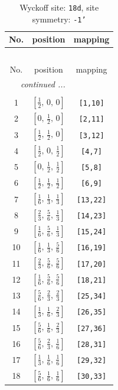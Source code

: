 \documentclass[fleqn,8pt]{jsarticle}
\begin{document}
\begin{longtable}{ccc}
\caption{Wyckoff site: {\tt 18d}, site symmetry: {\tt -1'}}
 \\
 \hline \hline
No. & position & mapping \\ \hline \endfirsthead

\multicolumn{2}{l}{\tablename\ \thetable{}} \\
 \hline \hline
No. & position & mapping \\ \hline \endhead

 \hline \hline
\multicolumn{2}{r}{\footnotesize\it continued ...} \\ \endfoot

 \hline \hline
\multicolumn{2}{r}{} \\ \endlastfoot

1 & $\left[ \frac{1}{2},\, 0,\, 0 \right]$ & {\tt [1,10]} \\ \hline
2 & $\left[ 0,\, \frac{1}{2},\, 0 \right]$ & {\tt [2,11]} \\ \hline
3 & $\left[ \frac{1}{2},\, \frac{1}{2},\, 0 \right]$ & {\tt [3,12]} \\ \hline
4 & $\left[ \frac{1}{2},\, 0,\, \frac{1}{2} \right]$ & {\tt [4,7]} \\ \hline
5 & $\left[ 0,\, \frac{1}{2},\, \frac{1}{2} \right]$ & {\tt [5,8]} \\ \hline
6 & $\left[ \frac{1}{2},\, \frac{1}{2},\, \frac{1}{2} \right]$ & {\tt [6,9]} \\ \hline
7 & $\left[ \frac{1}{6},\, \frac{1}{3},\, \frac{1}{3} \right]$ & {\tt [13,22]} \\ \hline
8 & $\left[ \frac{2}{3},\, \frac{5}{6},\, \frac{1}{3} \right]$ & {\tt [14,23]} \\ \hline
9 & $\left[ \frac{1}{6},\, \frac{5}{6},\, \frac{1}{3} \right]$ & {\tt [15,24]} \\ \hline
10 & $\left[ \frac{1}{6},\, \frac{1}{3},\, \frac{5}{6} \right]$ & {\tt [16,19]} \\ \hline
11 & $\left[ \frac{2}{3},\, \frac{5}{6},\, \frac{5}{6} \right]$ & {\tt [17,20]} \\ \hline
12 & $\left[ \frac{1}{6},\, \frac{5}{6},\, \frac{5}{6} \right]$ & {\tt [18,21]} \\ \hline
13 & $\left[ \frac{5}{6},\, \frac{2}{3},\, \frac{2}{3} \right]$ & {\tt [25,34]} \\ \hline
14 & $\left[ \frac{1}{3},\, \frac{1}{6},\, \frac{2}{3} \right]$ & {\tt [26,35]} \\ \hline
15 & $\left[ \frac{5}{6},\, \frac{1}{6},\, \frac{2}{3} \right]$ & {\tt [27,36]} \\ \hline
16 & $\left[ \frac{5}{6},\, \frac{2}{3},\, \frac{1}{6} \right]$ & {\tt [28,31]} \\ \hline
17 & $\left[ \frac{1}{3},\, \frac{1}{6},\, \frac{1}{6} \right]$ & {\tt [29,32]} \\ \hline
18 & $\left[ \frac{5}{6},\, \frac{1}{6},\, \frac{1}{6} \right]$ & {\tt [30,33]} \\
\end{longtable}
\end{document}
